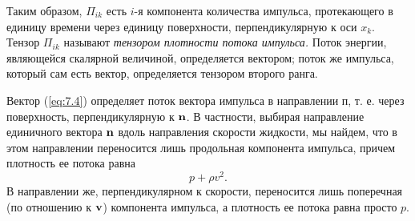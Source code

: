 Таким образом, $\Pi_{ik}$ есть $i$-я компонента количества импульса,
протекающего в единицу времени через единицу поверхности, перпендикулярную к оси
$x_k$. Тензор $\Pi_{ik}$ называют \textit{тензором плотности потока импульса.}
Поток энергии, являющейся скалярной величиной, определяется вектором; поток же
импульса, который сам есть вектор, определяется тензором второго ранга.

Вектор (\ref{eq:7.4}) определяет поток вектора импульса в направлении п, т. е. через
поверхность, перпендикулярную к $\mathbf{n}$. В частности, выбирая направление
единичного вектора $\mathbf{n}$ вдоль направления скорости жидкости, мы найдем, что
в этом направлении переносится лишь продольная компонента импульса, причем
плотность ее потока равна
\[
   p + \rho v^2.
\]
В направлении же, перпендикулярном к скорости, переносится лишь поперечная
(по отношению к ${\mathbf{v}}$) компонента импульса, а плотность ее потока равна просто
$p$.
